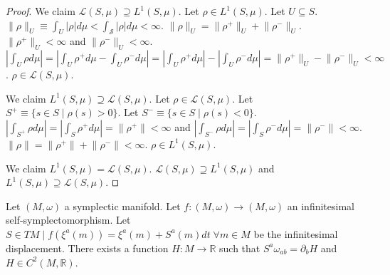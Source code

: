 \documentclass[smallextended]{svjour3}
\numberwithin{equation}{section}
\renewenvironment{proof}{\emph{Proof}.}{\hfill\(\qed\)}
\begin{document}
\begin{proof}
	We claim $\mathcal{L}(S,\mu) \supseteq L^1(S,\mu)$. Let $\rho \in L^1(S,\mu)$. Let $U \subseteq S$. $\lVert \rho \rVert_U \equiv \int_{U} |\rho| d\mu < \int_{\mathcal{S}} |\rho| d\mu < \infty$. $\lVert \rho \rVert_U = \lVert \rho^+ \rVert_U + \lVert \rho^- \rVert_U$. $\lVert \rho^+ \rVert_U < \infty$ and $\lVert \rho^- \rVert_U < \infty$. $|\int_{U} \rho d\mu| = |\int_{U} \rho^+ d\mu - \int_{U} \rho^- d\mu| = |\int_{U} \rho^+ d\mu| - |\int_{U} \rho^- d\mu| = \lVert \rho^+ \rVert_U - \lVert \rho^- \rVert_U < \infty$. $\rho \in\mathcal{L}(S,\mu)$.
	
	We claim $L^1(S,\mu) \supseteq \mathcal{L}(S,\mu)$.  Let $\rho \in \mathcal{L}(S,\mu)$. Let $S^+ \equiv  \{ s \in S \; | \; \rho(s) > 0\}$. Let $S^- \equiv  \{ s \in S \; | \; \rho(s) < 0\}$. $|\int_{S^+} \rho d\mu| = |\int_{S} \rho^+ d\mu| = \lVert \rho^+ \rVert < \infty$ and $|\int_{S^-} \rho d\mu| = |\int_{S} \rho^- d\mu| = \lVert \rho^- \rVert < \infty$. $\lVert \rho \rVert = \lVert \rho^+ \rVert + \lVert \rho^- \rVert < \infty$. $\rho \in L^1(S,\mu)$.
	
	We claim $L^1(S,\mu) = \mathcal{L}(S,\mu)$. $\mathcal{L}(S,\mu) \supseteq L^1(S,\mu)$ and $L^1(S,\mu) \supseteq \mathcal{L}(S,\mu)$.	
\end{proof}

\begin{thrm}\label{symplectomorphism_generator}
	Let $(M, \omega)$ a symplectic manifold. Let $f: (M, \omega) \rightarrow (M, \omega)$ an infinitesimal self-symplectomorphism. Let $S \in TM \; | \; f(\xi^a(m)) = \xi^a(m) + S^a(m)dt \; \forall m \in M$ be the infinitesimal displacement. There exists a function $H: M \rightarrow \mathbb{R}$ such that $S^{a} \omega_{ab} = \partial_{b}H$ and $H \in C^2(M, \mathbb{R})$.
\end{thrm}
\end{document}
